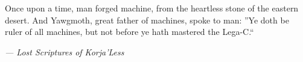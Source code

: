 Once upon a time, man forged machine, from the heartless stone of the eastern desert. And Yawgmoth, great father of machines, spoke to man: ''Ye doth be ruler of all machines, but not before ye hath mastered the Lega-C.``
\vspace{-.4em}\begin{flushright} \emph{--- Lost Scriptures of Korja'Less} \end{flushright}
